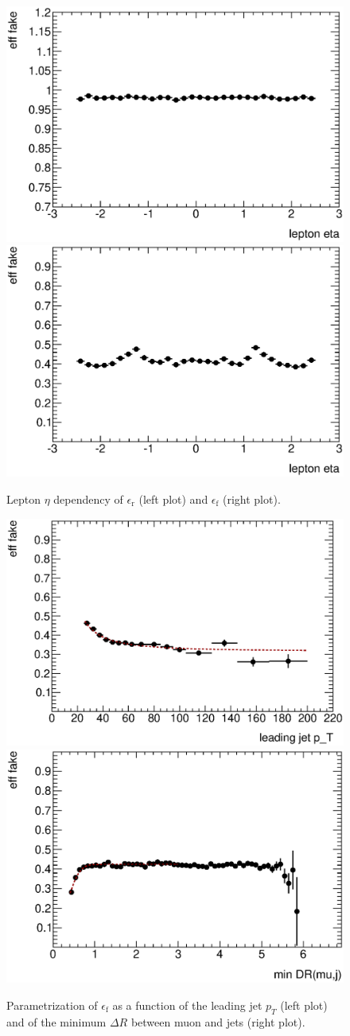 \begin{figure}\centering
\includegraphics[width=.45\textwidth]{appendices/figures/mujets_mmB/fit_h_lep_eta_muon_real_untagged}\includegraphics[width=.45\textwidth]{appendices/figures/mujets_mmB/fit_h_lep_eta_muon_fake_untagged}
\caption{Lepton $\eta$ dependency of $\epsilon_\mathrm{r}$ (left plot) and $\epsilon_\mathrm{f}$ (right plot).}\label{fig:etaDep}
\end{figure} \begin{figure}\centering
\includegraphics[width=.45\textwidth]{appendices/figures/mujets_mmB/fit_h_lep_LJpT_rb_muon_fake_untagged}\includegraphics[width=.45\textwidth]{appendices/figures/mujets_mmB/fit_h_lep_minDR_muon_fake_untagged}
\caption{Parametrization of $\epsilon_\mathrm{f}$ as a function of the leading jet $p_T$ (left plot) and of the minimum $\Delta R$ between muon and jets (right plot). }\label{fig:ljptmindrDep}
\end{figure} 

